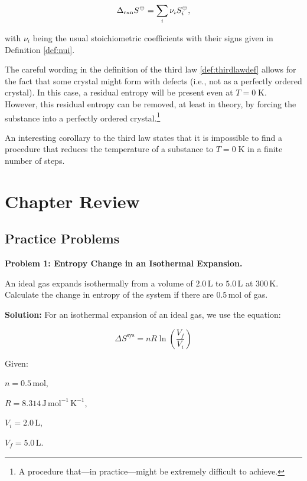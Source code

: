 \documentclass[
  9pt,
]{extbook}
\theoremstyle{definition}
\theoremstyle{definition}
\theoremstyle{definition}
\theoremstyle{remark}
\begin{document}
\begin{equation}
\Delta_{\text{rxn}} S^{-\kern-6pt{\ominus}\kern-6pt-}= \sum_i \nu_i S_i^{-\kern-6pt{\ominus}\kern-6pt-},
\label{eq:thirdlaweq}
\end{equation}

with \(\nu_i\) being the usual stoichiometric coefficients with their signs given in Definition \ref{def:nui}.

The careful wording in the definition of the third law \ref{def:thirdlawdef} allows for the fact that some crystal might form with defects (i.e., not as a perfectly ordered crystal). In this case, a residual entropy will be present even at \(T=0 \; \text{K}\). However, this residual entropy can be removed, at least in theory, by forcing the substance into a perfectly ordered crystal.\footnote{A procedure that---in practice---might be extremely difficult to achieve.}

An interesting corollary to the third law states that it is impossible to find a procedure that reduces the temperature of a substance to \(T=0 \; \text{K}\) in a finite number of steps.

\hypertarget{rev7}{%
\section{Chapter Review}\label{rev7}}

\hypertarget{exer7}{%
\subsection{Practice Problems}\label{exer7}}

\textbf{Problem 1: Entropy Change in an Isothermal Expansion.}

An ideal gas expands isothermally from a volume of \(2.0\,\text{L}\) to \(5.0\,\text{L}\) at \(300\,\text{K}\). Calculate the change in entropy of the system if there are \(0.5\,\text{mol}\) of gas.

\textbf{Solution:} For an isothermal expansion of an ideal gas, we use the equation:

\[\Delta S^{\text{sys}} = nR \ln \left(\frac{V_f}{V_i}\right)\]

Given:

\(n = 0.5\,\text{mol}\),

\(R = 8.314\,\text{J} \, \text{mol}^{-1} \, \text{K}^{-1}\),

\(V_i = 2.0\,\text{L}\),

\(V_f = 5.0\,\text{L}\).
\end{document}
